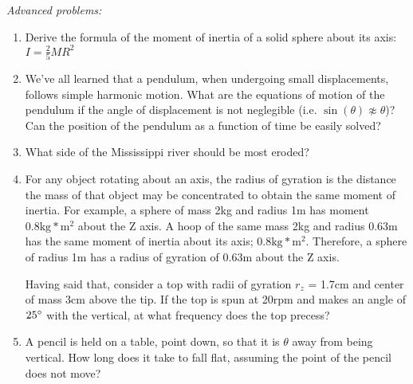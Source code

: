 \documentclass[12pt]{article}
\begin{document}
\emph{Advanced problems:}
\begin{enumerate}
\item
Derive the formula of the moment of inertia of a solid sphere about its axis: $I = \frac{2}{5}MR^2$

\item
We've all learned that a pendulum, when undergoing small displacements, follows simple harmonic motion. What are the equations of motion of the pendulum if the angle of displacement is not neglegible (i.e. $\sin(\theta) \not\approx \theta$)? Can the position of the pendulum as a function of time be easily solved?

\item
What side of the Mississippi river should be most eroded?

\item
For any object rotating about an axis, the radius of gyration is the distance the mass of that object may be concentrated to obtain the same moment of inertia.
For example, a sphere of mass 2kg and radius 1m has moment $0.8 \text{kg}*\text{m}^2$ about the Z axis. A hoop of the same mass 2kg and radius 0.63m has the same moment of inertia about its axis; $0.8 \text{kg}*\text{m}^2$. Therefore, a sphere of radius 1m has a radius of gyration of 0.63m about the Z axis. 

Having said that, consider a top with radii of gyration $r_z$ = 1.7cm and center of mass 3cm above the tip. If the top is spun at 20rpm and makes an angle of $25\degree$ with the vertical, at what frequency does the top precess?

\item
A pencil is held on a table, point down, so that it is $\theta$ away from being vertical. How long does it take to fall flat, assuming the point of the pencil does not move?
\end{enumerate}
\end{document}
